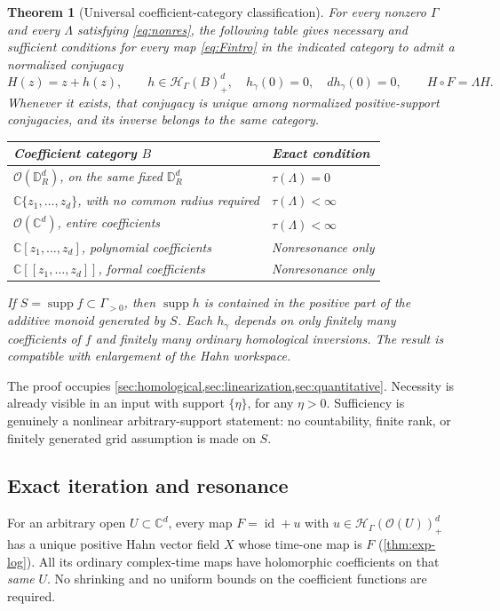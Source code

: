 \documentclass[11pt,letterpaper]{article}
\newtheorem{theorem}{Theorem}[section]
\theoremstyle{definition}
\theoremstyle{remark}
\newcommand{\C}{\mathbb C}
\newcommand{\HH}{\mathscr H}
\newcommand{\OO}{\mathcal O}
\newcommand{\id}{\operatorname{id}}
\newcommand{\supp}{\operatorname{supp}}
\newcommand{\DR}{\mathbb D_R^d}
\numberwithin{equation}{section}
\begin{document}
\begin{theorem}[Universal coefficient-category classification]\label{thm:main}
For every nonzero $\Gamma$ and every $\Lambda$ satisfying
\eqref{eq:nonres}, the following table gives necessary and sufficient
conditions for \emph{every} map \eqref{eq:Fintro} in the indicated category to
admit a normalized conjugacy
\begin{equation}\label{eq:Schroeder}
 H(z)=z+h(z),\qquad h\in\HH_\Gamma(B)_+^d,\quad
 h_\gamma(0)=0,\quad dh_\gamma(0)=0,\qquad H\circ F=\Lambda H.
\end{equation}
Whenever it exists, that conjugacy is unique among normalized positive-support
conjugacies, and its inverse belongs to the same category.
{\normalfont
\begin{center}
\begin{tabular}{@{}P{0.65\textwidth}P{0.25\textwidth}@{}}
\toprule
Coefficient category $B$ & Exact condition\\
\midrule
$\OO(\DR)$, on the \emph{same fixed} $\DR$ & $\tau(\Lambda)=0$\\
$\C\{z_1,\ldots,z_d\}$, with no common radius required & $\tau(\Lambda)<\infty$\\
$\OO(\C^d)$, entire coefficients & $\tau(\Lambda)<\infty$\\
$\C[z_1,\ldots,z_d]$, polynomial coefficients & Nonresonance only\\
$\C[[z_1,\ldots,z_d]]$, formal coefficients & Nonresonance only\\
\bottomrule
\end{tabular}
\end{center}}
If $S=\supp f\subset\Gamma_{>0}$, then $\supp h$ is contained in the
positive part of the additive monoid generated by $S$. Each $h_\gamma$ depends
on only finitely many coefficients of $f$ and finitely many ordinary
homological inversions. The result is compatible with enlargement of the
Hahn workspace.
\end{theorem}
The proof occupies \cref{sec:homological,sec:linearization,sec:quantitative}.
Necessity is already visible in an input with support $\{\eta\}$, for any
$\eta>0$. Sufficiency is genuinely a nonlinear arbitrary-support statement:
no countability, finite rank, or finitely generated grid assumption is made
on $S$.

\subsection{Exact iteration and resonance}
For an arbitrary open $U\subset\C^d$, every map $F=\id+u$ with
$u\in\HH_\Gamma(\OO(U))_+^d$ has a unique positive Hahn vector field $X$
whose time-one map is $F$ (\cref{thm:exp-log}). All its ordinary complex-time
maps have holomorphic coefficients on that \emph{same} $U$. No shrinking and
no uniform bounds on the coefficient functions are required.
\end{document}
